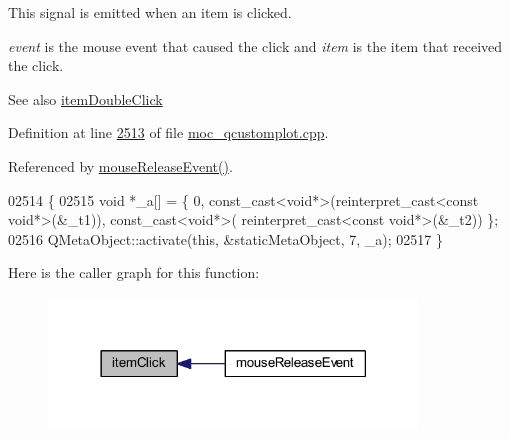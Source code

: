 This signal is emitted when an item is clicked. 

{\itshape event} is the mouse event that caused the click and {\itshape item} is the item that received the click.

\begin{DoxySeeAlso}{See also}
\hyperlink{a00116_ac83aa9f5a3e9bb3efc9cdc763dcd42a6}{item\+Double\+Click} 
\end{DoxySeeAlso}


Definition at line \hyperlink{a00067_source_l02513}{2513} of file \hyperlink{a00067_source}{moc\+\_\+qcustomplot.\+cpp}.



Referenced by \hyperlink{a00115_source_l07691}{mouse\+Release\+Event()}.


\begin{DoxyCode}
02514 \{
02515     \textcolor{keywordtype}{void} *\_a[] = \{ 0, \textcolor{keyword}{const\_cast<}\textcolor{keywordtype}{void}*\textcolor{keyword}{>}(\textcolor{keyword}{reinterpret\_cast<}\textcolor{keyword}{const }\textcolor{keywordtype}{void}*\textcolor{keyword}{>}(&\_t1)), \textcolor{keyword}{const\_cast<}\textcolor{keywordtype}{void}*\textcolor{keyword}{>}(\textcolor{keyword}{
      reinterpret\_cast<}\textcolor{keyword}{const }\textcolor{keywordtype}{void}*\textcolor{keyword}{>}(&\_t2)) \};
02516     QMetaObject::activate(\textcolor{keyword}{this}, &staticMetaObject, 7, \_a);
02517 \}
\end{DoxyCode}


Here is the caller graph for this function\+:
\nopagebreak
\begin{figure}[H]
\begin{center}
\leavevmode
\includegraphics[width=278pt]{d4/d3e/a00116_ae16b51f52d2b7aebbc7e3e74e6ff2e4b_icgraph}
\end{center}
\end{figure}


